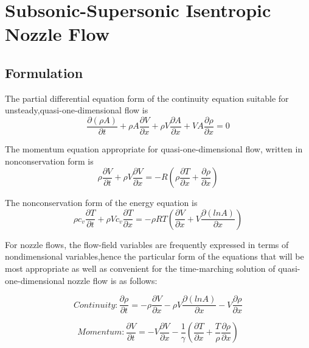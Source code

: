 

\section{Subsonic-Supersonic Isentropic Nozzle Flow}

\subsection{Formulation}

The partial differential equation form of the continuity equation suitable for unsteady,quasi-one-dimensional flow is
\begin{equation}
\frac{\partial(\rho A)}{\partial t} + \rho A\frac{\partial V}{\partial x}+ \rho V\frac{\partial A}{\partial x}+ V A\frac{\partial \rho}{\partial x}=0
\end{equation}

The momentum equation appropriate for quasi-one-dimensional flow, written in nonconservation form is
\begin{equation}
\rho \frac{\partial V}{\partial t}+\rho V \frac{\partial V}{\partial x}=-R(\rho\frac{\partial T}{\partial x}+\frac{\partial \rho}{\partial x})
\end{equation}

The nonconservation form of the energy equation is
\begin{equation}
\rho c_v \frac{\partial T}{\partial t}+\rho V c_v \frac{\partial T}{\partial x} = - \rho R T (\frac{\partial V}{\partial x}+V\frac{\partial (lnA)}{\partial x})
\end{equation}

For nozzle flows, the flow-field variables are frequently expressed in terms of nondimensional variables,hence the particular form of the equations that will be most appropriate as well as convenient for the time-marching solution of quasi-one-dimensional nozzle flow is as follows:

\begin{equation}
Continuity: \frac{\partial \rho}{\partial t} = -\rho \frac{\partial V}{\partial x}- \rho V \frac{\partial (ln A)}{\partial x}-V\frac{\partial \rho}{\partial x}
\end{equation}

\begin{equation}
Momentum: \frac{\partial V}{\partial t}=-V\frac{\partial V}{\partial x}-\frac{1}{\gamma}( \frac{\partial T}{\partial x}+\frac{T}{\rho}\frac{\partial \rho}{\partial x} )
\end{equation}

